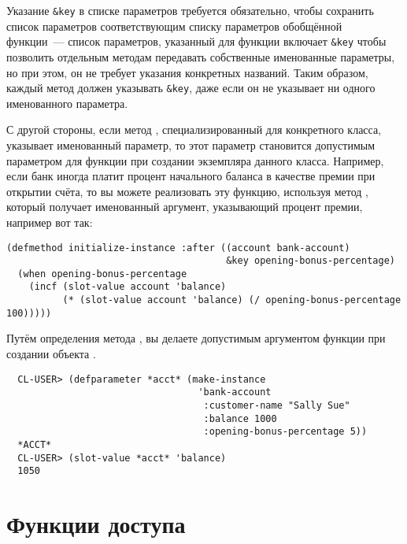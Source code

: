 Указание \lstinline!&key! в списке параметров требуется обязательно, чтобы сохранить
список параметров соответствующим списку параметров обобщённой функции~--- список
параметров, указанный для функции  включает \lstinline!&key!
чтобы позволить отдельным методам передавать собственные именованные параметры, но при
этом, он не требует указания конкретных названий.  Таким образом, каждый метод должен
указывать \lstinline!&key!, даже если он не указывает ни одного именованного параметра.

С другой стороны, если метод , специализированный для
конкретного класса, указывает именованный параметр, то этот параметр становится допустимым
параметром для функции  при создании экземпляра данного класса.
Например, если банк иногда платит процент начального баланса в качестве премии при
открытии счёта, то вы можете реализовать эту функцию, используя метод
, который получает именованный аргумент, указывающий процент
премии, например вот так:

\begin{lstlisting}
(defmethod initialize-instance :after ((account bank-account)
                                       &key opening-bonus-percentage)
  (when opening-bonus-percentage
    (incf (slot-value account 'balance)
          (* (slot-value account 'balance) (/ opening-bonus-percentage 100)))))
\end{lstlisting}

Путём определения метода , вы делаете
 допустимым аргументом функции  при
создании объекта .

\begin{verbatim}
  CL-USER> (defparameter *acct* (make-instance
                                  'bank-account
                                   :customer-name "Sally Sue"
                                   :balance 1000
                                   :opening-bonus-percentage 5))
  *ACCT*
  CL-USER> (slot-value *acct* 'balance)
  1050
\end{verbatim}

\section{Функции доступа}

